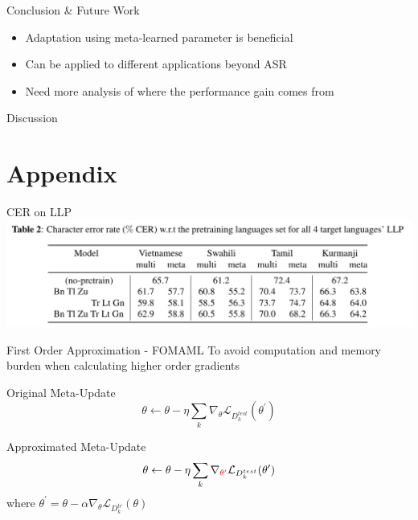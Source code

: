 \documentclass{beamer}
\begin{document}
\begin{frame}[t]{Conclusion \& Future Work}
  \begin{itemize}
    \item Adaptation using meta-learned parameter is beneficial
    \item Can be applied to different applications beyond ASR
    \item Need more analysis of where the performance gain comes from
  \end{itemize}
\end{frame}

\begin{frame}
	\begin{center}
    \LARGE{Discussion}
	\end{center}
\end{frame}

\section{Appendix}
\begin{frame}[t]{CER on LLP}
  \center \includegraphics[width=1.0\textwidth]{fig/llp_table.png}
\end{frame}

\begin{frame}[t]{First Order Approximation - FOMAML}
  To avoid computation and memory burden when calculating higher order gradients
  \begin{block}{Original Meta-Update}
    \begin{equation*}
      \theta \leftarrow \theta - \eta \sum_k \nabla_\theta \mathcal{L}_{D^{test}_k}(\theta^\prime)
    \end{equation*}
  \end{block}
  \begin{block}{Approximated Meta-Update}
    \begin{equation*}
      \theta \leftarrow \theta - \eta \sum_k \nabla_{\textcolor{red}{\theta^\prime}} \mathcal{L}_{D^{test}_k}(\theta^\prime)
    \end{equation*}
    \center where $\theta^\prime = \theta - \alpha \nabla_\theta \mathcal{L}_{D^{tr}_k} (\theta)$
  \end{block}
\end{frame}
\end{document}

